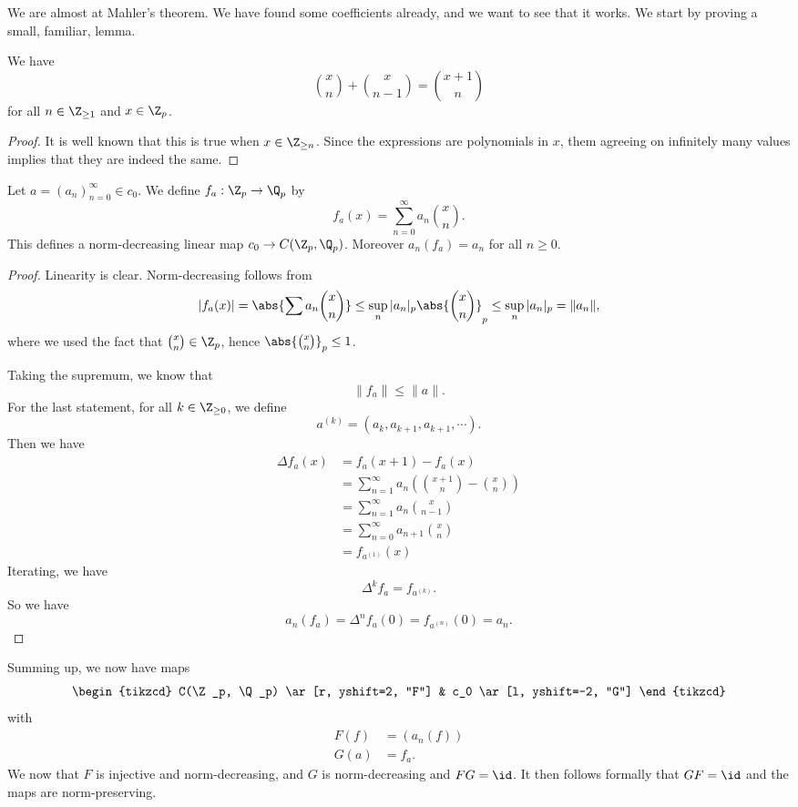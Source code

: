 \documentclass[a4paper]{article}
\begin{document}
We are almost at Mahler's theorem. We have found some coefficients already, and we want to see that it works. We start by proving a small, familiar, lemma.
\begin{lemma}
  We have
  \[
    \binom{x}{n} + \binom{x}{n - 1} = \binom{x + 1}{n}
  \]
  for all $n \in \Z_{\geq 1}$ and $x \in \Z_p$.
\end{lemma}

\begin{proof}
  It is well known that this is true when $x \in \Z_{\geq n}$. Since the expressions are polynomials in $x$, them agreeing on infinitely many values implies that they are indeed the same.
\end{proof}

\begin{prop}
  Let $a = (a_n)_{n = 0}^\infty \in c_0$. We define $f_a: \Z_p \to \Q_p$ by
  \[
    f_a(x) = \sum_{n = 0}^\infty a_n \binom{x}{n}.
  \]
  This defines a norm-decreasing linear map $c_0 \to C(\Z_p, \Q_p)$. Moreover $a_n(f_a) = a_n$ for all $n \geq 0$.
\end{prop}

\begin{proof}
  Linearity is clear. Norm-decreasing follows from
  \[
    |f_a(x)| = \abs{\sum a_n \binom{x}{n}} \leq \sup_n |a_n|_p \abs{\binom{x}{n}}_p \leq \sup_n |a_n|_p = \|a_n\|,
  \]
  where we used the fact that $\binom{x}{n} \in \Z_p$, hence $\abs{\binom{x}{n}}_p \leq 1$.

  Taking the supremum, we know that
  \[
    \|f_a\| \leq \|a\|.
  \]
  For the last statement, for all $k \in \Z_{\geq 0}$, we define
  \[
    a^{(k)} = (a_k, a_{k + 1},a_{k + 1}, \cdots).
  \]
  Then we have
  \begin{align*}
    \Delta f_a(x) &= f_a(x + 1) - f_a(x) \\
    &= \sum_{n = 1}^\infty a_n \left(\binom{x + 1}{n} - \binom{x}{n}\right)\\
    &= \sum_{n = 1}^\infty a_n \binom{x}{n - 1} \\
    &= \sum_{n = 0}^\infty a_{n + 1} \binom{x}{n}\\
    &= f_{a^(1)}(x)
  \end{align*}
  Iterating, we have
  \[
    \Delta^k f_a = f_{a^{(k)}}.
  \]
  So we have
  \[
    a_n(f_a) = \Delta^n f_a(0) = f_{a^{(n)}}(0) = a_n.
  \]
\end{proof}
Summing up, we now have maps
\[
  \begin{tikzcd}
    C(\Z_p, \Q_p) \ar[r, yshift=2, "F"] & c_0 \ar[l, yshift=-2, "G"]
  \end{tikzcd}
\]
with
\begin{align*}
  F(f) &= (a_n(f))\\
  G(a) &= f_a.
\end{align*}
We now that $F$ is injective and norm-decreasing, and $G$ is norm-decreasing and $FG = \id$. It then follows formally that $GF = \id$ and the maps are norm-preserving.
\end{document}
